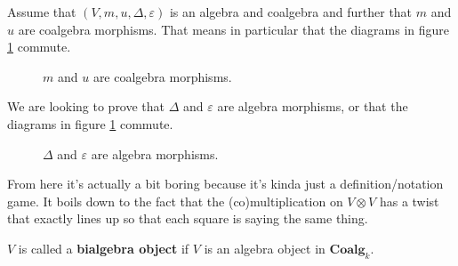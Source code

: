 \documentclass[12pt]{article}
\newcommand*{\Coalgk}{\mathbf{Coalg}_k}
\begin{document}
\begin{sol}
	Assume that $(V,m,u,\Delta,\varepsilon)$ is an algebra and coalgebra and further that
	$m$ and $u$ are coalgebra morphisms. That means in particular that the diagrams in figure \ref{fig-coalg-mor} commute.
	\begin{figure}[h]\label{fig-coalg-mor}
		\centering
		\label{fig-coalg-mor}
		\caption{$m$ and $u$ are coalgebra morphisms.}
	\end{figure}

	We are looking to prove that $\Delta$ and $\varepsilon$ are algebra morphisms, or that 
	the diagrams in figure \ref{fig-coalg-mor}  commute.
	\begin{figure}[h]
		\centering
		\label{fig-alg-mor}
		\caption{$\Delta$ and $\varepsilon$ are algebra morphisms.}
	\end{figure}

	From here it's actually a bit boring because it's kinda just a definition/notation game.
	It boils down to the fact that the (co)multiplication on $V\otimes V$ has a twist that 
	exactly lines up so that each square is saying the same thing.
\end{sol}

\begin{defn}
	$V$ is called a \textbf{bialgebra object} if $V$ is an algebra object in $\Coalgk$.
\end{defn}
\end{document}
